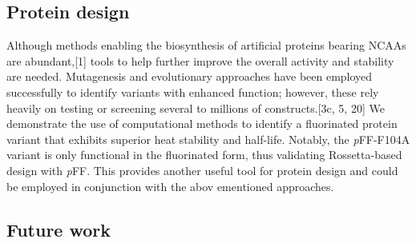 \begin{refsection}
\subsection{Protein design}

Although methods enabling the biosynthesis of artificial proteins bearing NCAAs
are abundant,[1] tools to help further improve the overall activity and
stability are needed. Mutagenesis and evolutionary approaches have been
employed successfully to identify variants with enhanced function; however,
these rely heavily on testing or screening several to millions of
constructs.[3c, 5, 20] We demonstrate the use of computational methods to
identify a fluorinated protein variant that exhibits superior heat stability
and half-life. Notably, the \emph{p}FF-F104A variant is only functional in the
fluorinated form, thus validating Rossetta-based design with \emph{p}FF. This
provides another useful tool for protein design and could be employed in
conjunction with the abov ementioned approaches.

\subsection{Future work}

\printbibliography[heading=subbibliography]

\end{refsection}
